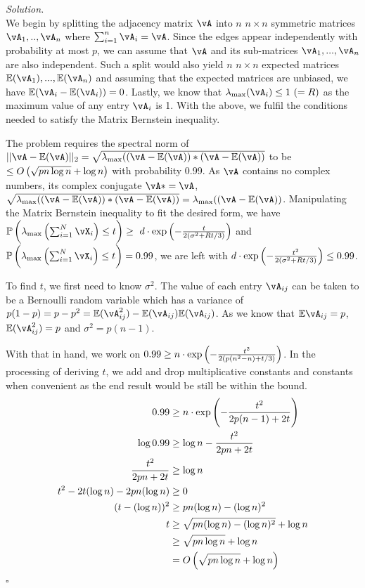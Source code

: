 \documentclass[11pt]{article}
\newcommand{\E}{\ensuremath{\mathbb{E}}} %
\renewcommand{\P}{\ensuremath{\mathbb{P}}} %
\theoremstyle{definition}
\newenvironment{solution}{\noindent\emph{Solution.}}{\hfill$\square$}
\begin{document}
\begin{solution}
\\
We begin by splitting the adjacency matrix $\vA$ into $n$ $n \times n$ symmetric matrices $\vA_1,.., \vA_n$ where $\sum_{i=1}^n \vA_i = \vA$.  Since the edges appear independently with probability at most $p$, we can assume that $\vA$ and its sub-matrices $\vA_1,...,\vA_n $ are also independent. Such a split would also yield $n$ $n \times n$ expected matrices $\E(\vA_1),...,\E(\vA_n)$ and assuming that the expected matrices are unbiased, we have $\E(\vA_i - \E(\vA_i)) = 0$. Lastly, we know that $\lambda_{\max}(\vA_i) \leq 1\ (= R)$ as the maximum value of any entry $\vA_i$ is 1. With the above, we fulfil the conditions needed to satisfy the Matrix Bernstein inequality.

The problem requires the spectral norm of $||\vA - \E(\vA)||_2 = \sqrt{\lambda_{\max}((\vA - \E(\vA))* (\vA - \E(\vA))}$ to be $ \leq O\del{ \sqrt{pn\log n} + \log n }$ with probability 0.99. As $\vA$ contains no complex numbers, its complex conjugate $\vA* = \vA$, $\sqrt{\lambda_{\max}((\vA - \E(\vA))* (\vA - \E(\vA))} = \lambda_{\max} ((\vA - \E(\vA))$. Manipulating the Matrix Bernstein inequality to fit the desired form, we have $\P\del{ \lambda_{\max}\del{\sum_{i=1}^N \vX_i} \leq t } \geq \ d \cdot \exp\del{ -\frac{t}{2(\sigma^2+Rt/3)} }$ and $\P\del{ \lambda_{\max}\del{\sum_{i=1}^N \vX_i} \leq t } = 0.99$, we are left with $ d \cdot \exp\del{ -\frac{t^2}{2(\sigma^2+Rt/3)} } \leq 0.99 $. 

To find $t$, we first need to know $\sigma^2$. The value of each entry $\vA_{ij}$ can be taken to be a Bernoulli random variable which has a variance of $p(1-p) = p - p^2 = \E(\vA_{ij}^2) - \E(\vA_{ij})\E(\vA_{ij})$. As we know that $\E\vA_{ij} = p$, $\E(\vA_{ij}^2) = p$ and $\sigma^2 =  p(n - 1)$.

With that in hand, we work on $0.99  \geq n \cdot \exp\del{ -\frac{t^2}{2(p(n^2 - n) + t/3)} }$. In the processing of deriving $t$, we add and drop multiplicative constants and constants when convenient as the end result would be still be within the bound.
\begin{align*}
0.99  &\geq n \cdot \exp\del{ -\frac{t^2}{2p(n-1) + 2t} }\\
\log 0.99 &\geq \log n - \frac{t^2}{2pn + 2t}\\
\frac{t^2}{2pn + 2t} &\geq \log n\\
t^2 - 2t(\log n) - 2pn (\log n ) &\geq 0 \\ 
(t- (\log n))^2 &\geq pn (\log n ) - (\log n)^2  \\ 
t &\geq \sqrt{pn (\log n ) - (\log n)^2} + \log n \\
&\geq \sqrt{pn\log n} + \log n \\
&= O\del{ \sqrt{pn\log n} + \log n}
\end{align*} 

\end{solution}
\end{document}
